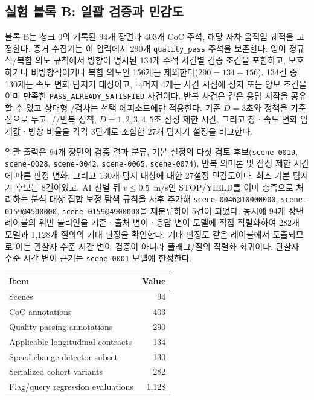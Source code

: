 \subsection{실험 블록 B: 일괄 검증과 민감도}
\label{sec:exp-block-b}

블록 B는 청크 0의 기록된 94개 장면과 403개 CoC 주석, 해당 자차 움직임 궤적을 고정한다. 증거 수집기는 이 입력에서 290개 \texttt{quality\_pass} 주석을 보존한다. 영어 정규식/복합 의도 규칙에서 방향이 명시된 134개 주석 사건별 검증 조건을 포함하고, 모호하거나 비방향적이거나 복합 의도인 156개는 제외한다($290=134+156$). 134건 중 130개는 속도 변화 탐지기 대상이고, 나머지 4개는 사건 시점에 정지 또는 양보 조건을 이미 만족한 \texttt{PASS\_ALREADY\_SATISFIED} 사건이다. 반복 사건은 같은 응답 시작을 공유할 수 있고 상태형 \preserve/\reset 검사는 선택 에피소드에만 적용한다. 기준 $D=3$초와 \preserve 정책을 기준점으로 두고, \preserve/\reset/\dedup 반복 정책, $D=1,2,3,4,5$초 잠정 제한 시간, 그리고 창ㆍ속도 변화 임계값ㆍ방향 비율을 각각 3단계로 조합한 27개 탐지기 설정을 비교한다.

일괄 출력은 94개 장면의 검증 결과 분류, 기본 설정의 다섯 검토 후보(\texttt{scene-0019}, \texttt{scene-0028}, \texttt{scene-0042}, \texttt{scene-0065}, \texttt{scene-0074}), 반복 의미론 및 잠정 제한 시간에 따른 판정 변화, 그리고 130개 탐지 대상에 대한 27설정 민감도이다. 최초 기본 탐지기 후보는 8건이었고, AI 선별 뒤 $v\leq0.5$~m/s인 STOP/YIELD를 이미 충족으로 처리하는 분석 대상 집합 보정 탐색 규칙을 사후 추가해 \texttt{scene-0046@10000000}, \texttt{scene-0159@4500000}, \texttt{scene-0159@4900000}을 재분류하여 5건이 되었다. 동시에 94개 장면 레이블의 위반 불리언을 기준ㆍ출처 변이ㆍ응답 변이 모델에 직접 직렬화하여 282개 모델과 1,128개 질의의 기대 판정을 확인한다. 기대 판정도 같은 레이블에서 도출되므로 이는 관찰자 수준 시간 변이 검증이 아니라 플래그/질의 직렬화 회귀이다. 관찰자 수준 시간 변이 근거는 \texttt{scene-0001} 모델에 한정한다.

\begin{table}[t]
\centering
{}
\label{tab:batch-size}
\begin{tabular}{lr}
\toprule
Item & Value \\
\midrule
Scenes & 94 \\
CoC annotations & 403 \\
Quality-passing annotations & 290 \\
Applicable longitudinal contracts & 134 \\
Speed-change detector subset & 130 \\
Serialized cohort variants & 282 \\
Flag/query regression evaluations & 1,128 \\
\bottomrule
\end{tabular}
\end{table}

